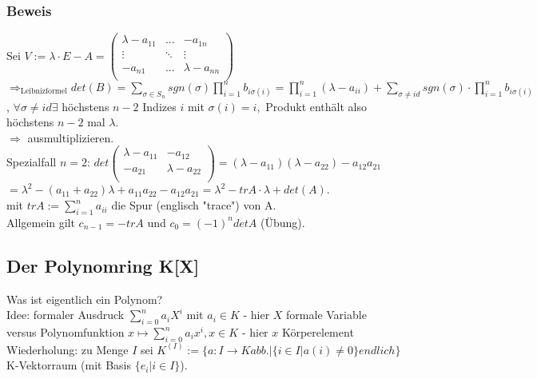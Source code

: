 \documentclass[a4paper, 12pt]{extarticle}
\begin{document}
\subsubsection*{Beweis}
Sei $V:= \lambda \cdot E - A = \left( \begin{matrix}
	\lambda - a_{11} & ... & -a_{1n} \\
	\vdots & \ddots &\vdots \\
	-a_{n1} & ... & \lambda - a_{nn}\\
\end{matrix} \right) $ \\
$\Rightarrow_{\text{Leibnizformel} } det(B) = \sum_{\sigma \in S_n} sgn(\sigma) \prod_{i=1}^{n} b_{i \sigma(i)} = \prod_{i=1}^{n} (\lambda - a_{ii}) + \sum_{\sigma \neq id} sgn(\sigma) \cdot \prod_{i=1}^{n} b_{i \sigma(i)}$, $\forall \sigma \neq id \exists$ höchstens $n-2$ Indizes $i$ mit $\sigma(i) = i,$ Produkt enthält also höchstens $n-2$ mal $\lambda$. \\
$\Rightarrow $ ausmultiplizieren.\\
Spezialfall $n = 2$:
$det\left(\begin{matrix}
	\lambda - a_{11} & -a_{12} \\
	-a_{21} & \lambda - a_{22} \\
\end{matrix}\right) = (\lambda - a_{11})(\lambda - a_{22}) - a_{12}a_{21}$ \\
$=  \lambda^2 - (a_{11} + a_{22}) \lambda + a_{11}a_{22} - a_{12}a_{21} = \lambda^2 - trA\cdot \lambda + det(A)$.\\
mit $trA:= \sum_{i=1}^{n} a_{ii}$ die Spur (englisch "trace") von A.\\
Allgemein gilt $c_{n-1} = -trA$ und $c_0 = (-1)^n detA$ (Übung).\\

\subsection*{Der Polynomring K[X]}
Was ist eigentlich ein Polynom? \\
Idee: formaler Ausdruck $\sum_{i=0}^{n}a_iX^i$ mit $a_i \in K$ - hier $X$ formale Variable \\
versus Polynomfunktion $x \mapsto \sum_{i=0}^{n} a_i x^i , x\in K$ - hier $x$ Körperelement\\
Wiederholung: zu Menge $I$ sei $K^{(I)} := \{ a: I \rightarrow K abb. | \{i \in I | a(i) \neq 0 \} endlich \}$ K-Vektorraum (mit Basis $\{ e_i | i\in I\}$).\\
\end{document}
